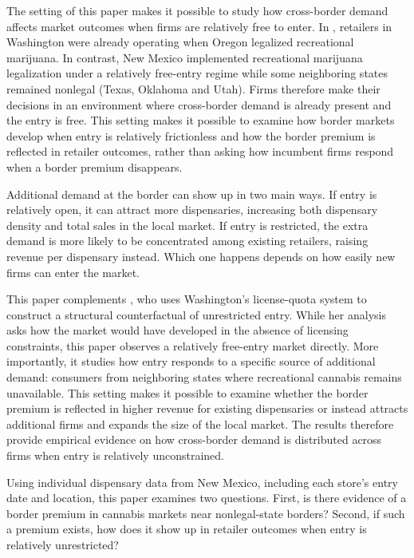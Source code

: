 \documentclass[12pt]{article}
\begin{document}
The setting of this paper makes it possible to study how cross-border demand affects market outcomes when firms are relatively free to enter. In \cite{HansenMillerWeber2020}, retailers in Washington were already operating when Oregon legalized recreational marijuana.
 In contrast, New Mexico implemented recreational marijuana legalization under a relatively free-entry regime while some neighboring states remained nonlegal (Texas, Oklahoma and Utah). Firms therefore make their decisions in an environment where cross-border demand is already present and the entry is free. This setting makes it possible to examine how border markets develop when entry is relatively frictionless and how the border premium is reflected in retailer outcomes, rather than asking how incumbent firms respond when a border premium disappears.

Additional demand at the border can show up in two main ways. If entry is relatively open, it can attract more dispensaries, increasing both dispensary density and total sales in the local market. If entry is restricted, the extra demand is more likely to be concentrated among existing retailers, raising revenue per dispensary instead. Which one happens depends on how easily new firms can enter the market.

This paper complements \cite{thomas2019license}, who uses Washington's license-quota system to construct a structural counterfactual of unrestricted entry. While her analysis asks how the market would have developed in the absence of licensing constraints, this paper observes a relatively free-entry market directly. More importantly, it studies how entry responds to a specific source of additional demand: consumers from neighboring states where recreational cannabis remains unavailable. This setting makes it possible to examine whether the border premium is reflected in higher revenue for existing dispensaries or instead attracts additional firms and expands the size of the local market. The results therefore provide empirical evidence on how cross-border demand is distributed across firms when entry is relatively unconstrained.


Using individual dispensary data from New Mexico, including each store’s entry date and location, this paper examines two questions. First, is there evidence of a border premium in cannabis markets near nonlegal-state borders? Second, if such a premium exists, how does it show up in retailer outcomes when entry is relatively unrestricted?
\end{document}
